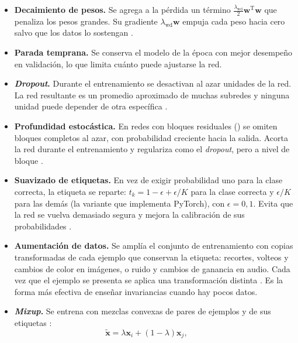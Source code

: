 \begin{itemize}[leftmargin=*, itemsep=2pt]
  \item \textbf{Decaimiento de pesos.} Se agrega a la pérdida un término
        $\frac{\lambda_{\mathrm{wd}}}{2}\mathbf{w}^{\mathrm{T}}\mathbf{w}$ que penaliza los pesos
        grandes. Su gradiente $\lambda_{\mathrm{wd}} \mathbf{w}$ empuja cada peso hacia cero
        salvo que los datos lo sostengan \citep[p.~260]{bishop2024deep}.
  \item \textbf{Parada temprana.} Se conserva el modelo de la época con mejor
        desempeño en validación, lo que limita cuánto puede ajustarse la red.
  \item \textbf{\textit{Dropout}.} Durante el entrenamiento se desactivan al
        azar unidades de la red. La red resultante es un promedio aproximado
        de muchas subredes y ninguna unidad puede depender de otra
        específica \citep[pp.~279--281]{bishop2024deep}.
  \item \textbf{Profundidad estocástica.} En redes con bloques residuales
        () se omiten bloques completos al azar, con
        probabilidad creciente hacia la salida. Acorta la red durante el
        entrenamiento y regulariza como el \textit{dropout}, pero a nivel de
        bloque \citep{huang2016stochasticdepth}.
  \item \textbf{Suavizado de etiquetas.} En vez de exigir probabilidad uno
        para la clase correcta, la etiqueta se reparte: $t_k = 1-\epsilon+\epsilon/K$
        para la clase correcta y $\epsilon/K$ para las demás (la variante
        que implementa PyTorch), con $\epsilon = 0{,}1$. Evita que la red se vuelva demasiado segura y
        mejora la calibración de sus probabilidades
        \citep{szegedy2016labelsmoothing}.
  \item \textbf{Aumentación de datos.} Se amplía el conjunto de entrenamiento
        con copias transformadas de cada ejemplo que conservan la etiqueta:
        recortes, volteos y cambios de color en imágenes, o ruido y cambios
        de ganancia en audio. Cada vez que el ejemplo se presenta se aplica
        una transformación distinta \citep[pp.~257--258]{bishop2024deep}.
        Es la forma más efectiva de enseñar invariancias cuando hay pocos
        datos.
  \item \textbf{\textit{Mixup}.} Se entrena con mezclas convexas de pares de
        ejemplos y de sus etiquetas \citep{zhang2018mixup}:
        \begin{equation}
          \tilde{\mathbf{x}} = \lambda \mathbf{x}_i + (1-\lambda)\mathbf{x}_j, \qquad

\end{equation}
\end{itemize}
